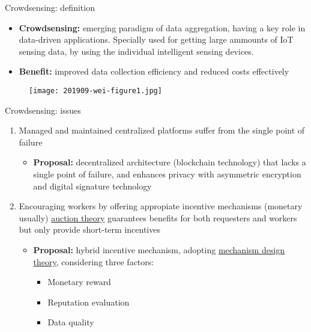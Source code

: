 \begin{frame}{Crowdsensing: definition}
  \begin{itemize}
  \item \textbf{Crowdsensing:} emerging paradigm of data aggregation\cite{paper1}, having a key role in data-driven applications. Specially used for getting large ammounts of IoT sensing data, by using the individual intelligent sensing devices.
  \item \textbf{Benefit:} improved data collection efficiency and reduced costs effectively\cite{paper2}
  \end{itemize}
  \begin{figure}[h]
        \centering
        \texttt{[image: 201909-wei-figure1.jpg]}
      \end{figure}
\end{frame}

\begin{frame}{Crowdsensing: issues}
  		\begin{enumerate}
   			\item Managed and maintained \alert{centralized platforms} suffer from the single point of failure
   				\begin{itemize}
   					\item \textbf{Proposal: } decentralized architecture (blockchain technology) that lacks a single point of failure, and enhances privacy with asymmetric encryption and digital signature technology
   				\end{itemize}
    		\item Encouraging workers by offering appropiate \alert{incentive mechanisms} (monetary usually) \rightarrow  \underline{auction theory} guarantees benefits for both requesters and workers\cite{paper15} but only provide short-term incentives
    			\begin{itemize}
   					\item \textbf{Proposal:} hybrid incentive mechanism, adopting \underline{mechanism design theory}, considering three factors:
   					\begin{itemize}
   					\item Monetary reward
   					\item Reputation evaluation
   					\item Data quality
   					\end{itemize}
   				\end{itemize}
  		\end{enumerate}
\end{frame}
